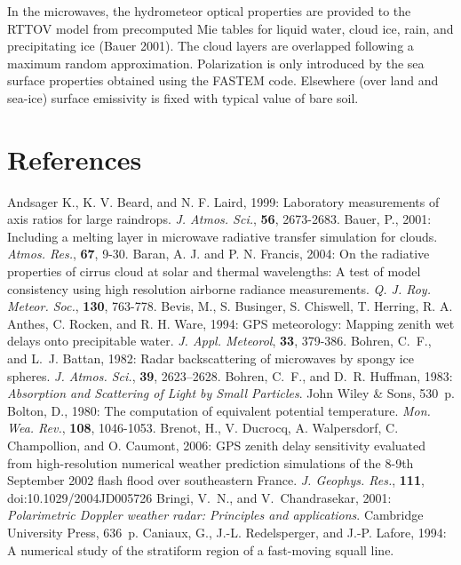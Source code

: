 In the microwaves, the hydrometeor optical properties are provided to the RTTOV
model from precomputed Mie tables for liquid water, cloud ice, rain, and
precipitating ice (Bauer 2001). The cloud layers are overlapped following
a maximum random approximation. Polarization is only introduced by the sea
surface properties obtained using the FASTEM code. Elsewhere (over land
and sea-ice) surface emissivity is fixed with typical value of bare soil.


\section{References}
\decrefname
Andsager K., K. V. Beard, and N. F. Laird, 1999: 
      Laboratory measurements of axis ratios for large raindrops.
      {\it J. Atmos. Sci.},
      {\bf 56},
      2673-2683.
\decrefname
Bauer, P., 2001: Including a melting layer in microwave radiative transfer
       simulation for clouds. {\it Atmos. Res.}, {\bf 67}, 9-30.
\decrefname
Baran, A. J. and P. N. Francis, 2004:
      On the radiative properties of cirrus cloud at solar and thermal
      wavelengths: A test of model consistency using high resolution
      airborne radiance measurements.
      {\it Q. J. Roy. Meteor. Soc.}, {\bf 130}, 763-778.
\decrefname
Bevis, M., S. Businger, S. Chiswell, T. Herring, R. A. Anthes, C. Rocken, and R. H. Ware, 1994:
      GPS meteorology: Mapping zenith wet delays onto precipitable water.
      {\it J. Appl. Meteorol}, {\bf 33}, 379-386.
\decrefname
Bohren, C.~F., and L.~J. Battan, 1982: Radar backscattering of microwaves by
  spongy ice spheres. {\em J. Atmos. Sci.}, {\bf 39}, 2623--2628.
\decrefname
Bohren, C.~F., and D.~R. Huffman, 1983: {\em Absorption and Scattering of Light by
  Small Particles}. John Wiley \& Sons, 530~p.
\decrefname
Bolton, D., 1980: The computation of equivalent potential temperature.
      {\it Mon. Wea. Rev.}, 
      {\bf 108},
      1046-1053.
\decrefname
Brenot, H., V. Ducrocq, A. Walpersdorf, C. Champollion, and O. Caumont, 2006:
GPS zenith delay sensitivity evaluated from high-resolution numerical weather prediction
simulations of the 8-9th September 2002 flash flood over southeastern France.
      {\it J. Geophys. Res.},
      {\bf 111},
      doi:10.1029/2004JD005726
\decrefname
Bringi, V.~N., and V.~Chandrasekar, 2001: {\em Polarimetric {Doppler} weather
  radar\string: {Principles} and applications}. Cambridge University Press,
  636~p.
\decrefname
Caniaux, G., J.-L. Redelsperger, and J.-P. Lafore, 1994:
      A numerical study of the stratiform region of a fast-moving squall line.
